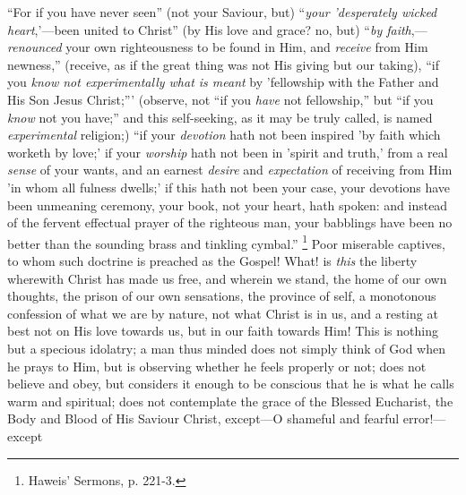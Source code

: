 ``For if you have never seen'' (not your Saviour, but)
``\emph{your 'desperately wicked heart},'—been united to
Christ'' (by His love and grace? no, but) ``\emph{by faith},—\emph{renounced}
your own righteousness to be found in Him, and \emph{receive} from Him
newness,'' (receive, as if the great thing was not His giving but
our taking), ``if you \emph{know not experimentally what is meant}
by 'fellowship with the Father and His Son Jesus Christ;'''
(observe, not ``if you \emph{have} not fellowship,'' but
``if you \emph{know} not you have;'' and this self-seeking, as
it may be truly called, is named \emph{experimental} religion;)
``if your \emph{devotion} hath not been inspired 'by faith which
worketh by love;' if your \emph{worship} hath not been in
'spirit and truth,' from a real \emph{sense} of your wants, and an
earnest \emph{desire} and \emph{expectation} of receiving from Him 'in
whom all fulness dwells;' if this hath not been your case, your
devotions have been unmeaning ceremony, your book, not your heart,
hath spoken: and instead of the fervent effectual prayer of the
righteous man, your babblings have been no better than the sounding
brass and tinkling cymbal.'' \footnote{Haweis'
Sermons, p. 221-3.} Poor miserable captives, to whom such doctrine is preached as
the Gospel! What! is \emph{this} the liberty wherewith Christ has made
us free, and wherein we stand, the home of our own thoughts, the
prison of our own sensations, the province of self, a monotonous
confession of what we are by nature, not what Christ is in us, and a
resting at best not on His love towards us, but in our faith towards
Him! This is nothing but a specious idolatry; a man thus minded does
not simply think of God when he prays to Him, but is observing whether
he feels properly or not; does not believe and obey, but considers it
enough to be conscious that he is what he calls warm and spiritual;
does not contemplate the grace of the Blessed Eucharist, the Body and
Blood of His Saviour Christ, except—O shameful and fearful error!—except

